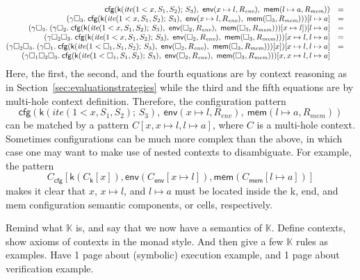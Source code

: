 \documentclass[acmsmall,review,anonymous]{acmart}
\newcommand{\K}{$\mathbb{K}$\xspace}
\newcommand{\hole}{\square}
\newcommand{\ite}{\textit{ite}}
\begin{document}
$$
\begin{array}{@{}rcl}
\textsf{cfg}
(
\textsf{k}(\ite(1 < x,S_1,S_2)\textsf{;\ }S_3),
\ \textsf{env}(x \mapsto l, R_\textit{env})
,
\ \textsf{mem}(l \mapsto a, R_\textit{mem})
)
&=&
\\
(\gamma\hole_3.\;\textsf{cfg}
(
\textsf{k}(\ite(1 < x,S_1,S_2)\textsf{;\ }S_3),
\ \textsf{env}(x \mapsto l, R_\textit{env})
,
\ \textsf{mem}(\hole_3,R_\textit{mem})))[l \mapsto a]
&=&
\\
(\gamma\hole_3.\;
(\gamma\hole_2.\;
\textsf{cfg}
(
\textsf{k}(\ite(1 < x,S_1,S_2)\textsf{;\ }S_3),
\ \textsf{env}(\hole_2, R_\textit{env})
,
\ \textsf{mem}(\hole_3,R_\textit{mem})))[x \mapsto l])[l \mapsto a]
&=&
\\
(\gamma\hole_2\hole_3.\;
\textsf{cfg}
(
\textsf{k}(\ite(1 < x,S_1,S_2)\textsf{;\ }S_3),
\ \textsf{env}(\hole_2, R_\textit{env})
,
\ \textsf{mem}(\hole_3,R_\textit{mem})))[x \mapsto l,l \mapsto a]
&=&
\\
(\gamma\hole_2\hole_3.\;
(\gamma\hole_1.\;
\textsf{cfg}
(
\textsf{k}(\ite(1 < \hole_1,S_1,S_2)\textsf{;\ }S_3),
\ \textsf{env}(\hole_2, R_\textit{env})
,
\ \textsf{mem}(\hole_3,R_\textit{mem})))[x]
)[x \mapsto l,l \mapsto a]
&=&
\\
(\gamma\hole_1\hole_2\hole_3.\;
\textsf{cfg}
(
\textsf{k}(\ite(1 < \hole_1,S_1,S_2)\textsf{;\ }S_3),
\ \textsf{env}(\hole_2, R_\textit{env})
,
\ \textsf{mem}(\hole_3, R_\textit{mem})
))
[x, x \mapsto l, l \mapsto a]
\end{array}
$$
Here, the first, the second, and the fourth equations
are by context reasoning as in Section~\ref{sec:evaluationstrategies}
while the third and the fifth equations are by
multi-hole context definition.
Therefore, the configuration pattern
$$
\textsf{cfg}
(
\textsf{k}(\ite(1 < x,S_1,S_2)\textsf{;\ }S_3),
\ \textsf{env}(x \mapsto l, R_\textit{env})
,
\ \textsf{mem}(l \mapsto a, R_\textit{mem})
)
$$
can be matched by a pattern $C[x,x\mapsto l,l\mapsto a]$, where $C$ is a
multi-hole context.
Sometimes configurations can be much more complex than the above, in which
case one may want to make use of nested contexts to disambiguate.
For example, the pattern
$$
C_{\textsf{cfg}}[\textsf{k}(C_{\textsf{k}}[x]),\textsf{env}(C_{\textsf{env}}[x\mapsto
 l]),\textsf{mem}(C_{\textsf{mem}}[l\mapsto a])]
$$
makes it clear that $x$, $x\mapsto l$, and $l\mapsto a$ must be located inside
the \textsf{k}, \textsf{end}, and \textsf{mem} configuration semantic
components, or cells, respectively.

Remind what \K is, and say that we now have a semantics of \K.
Define contexts, show axioms of contexts in the monad style.
And then give a few \K rules as examples. 
Have 1 page about (symbolic) execution example,
and 1 page about verification example.
\end{document}
